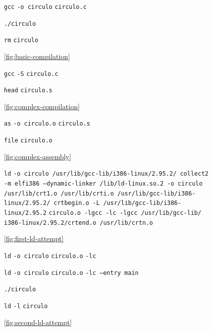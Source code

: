 \documentclass[11pt]{article}
\newcommand{\codetext}[2]{\large\texttt{\textcolor{#1}{#2}}}
\newcommand{\imagecaption}[1]{\vspace{-7pt}\caption*{\char91\ref{fig:#1}\char93}}
\begin{document}
		\begin{figure}[H]
			\centering
			\begin{code-box}
				\codetext{light-blue}{gcc} \codetext{orange-desert-vim}{-o circulo} \codetext{light-red}{circulo.c}
				
				\codetext{light-blue}{./circulo}
				
				\codetext{light-blue}{rm} \codetext{light-red}{circulo}
			\end{code-box}
			\imagecaption{basic-compilation}
		\end{figure}
		
		\begin{figure}[H]
			\centering
			\begin{code-box}
				\codetext{light-blue}{gcc} \codetext{orange-desert-vim}{-S} \codetext{light-red}{circulo.c}
				
				\codetext{light-blue}{head} \codetext{light-red}{circulo.s}
			\end{code-box}
			\imagecaption{complex-compilation}
		\end{figure}
		
		\begin{figure}[H]
			\centering
			\begin{code-box}
				\codetext{light-blue}{as} \codetext{orange-desert-vim}{-o circulo.o} \codetext{light-red}{circulo.s}
				
				\codetext{light-blue}{file} \codetext{light-red}{circulo.o}
			\end{code-box}
			\imagecaption{complex-assembly}
		\end{figure}
		
		\begin{figure}[H]
			\centering
			\begin{code-box}
			\codetext{light-blue}{ld} \codetext{orange-desert-vim}{-o circulo /usr/lib/gcc-lib/i386-linux/2.95.2/ collect2 -m elf\textunderscore{}i386 --dynamic-linker /lib/ld-linux.so.2 -o circulo /usr/lib/crt1.o /usr/lib/crti.o /usr/lib/gcc-lib/i386-linux/2.95.2/ crtbegin.o -L /usr/lib/gcc-lib/i386-linux/2.95.2} \codetext{light-red}{circulo.o }\codetext{orange-desert-vim}{-lgcc -lc -lgcc /usr/lib/gcc-lib/ i386-linux/2.95.2/crtend.o /usr/lib/crtn.o}
			\end{code-box}
			\imagecaption{first-ld-attempt}
		\end{figure}
		
		\begin{figure}[H]
			\centering
			\begin{code-box}
				\codetext{light-blue}{ld} \codetext{orange-desert-vim}{-o circulo} \codetext{light-red}{circulo.o} \codetext{orange-desert-vim}{-lc}
				
				\codetext{light-blue}{ld} \codetext{orange-desert-vim}{-o circulo} \codetext{light-red}{circulo.o} \codetext{orange-desert-vim}{-lc --entry main}
				
				\codetext{light-blue}{./circulo}
				
				\codetext{light-blue}{ld} \codetext{orange-desert-vim}{-l} \codetext{light-red}{circulo}
			\end{code-box}
			\imagecaption{second-ld-attempt}
		\end{figure}
		
\end{document}
